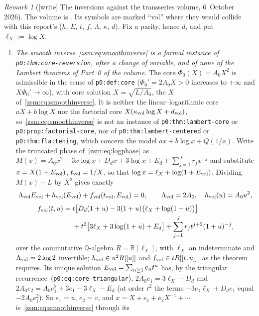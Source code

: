 \documentclass[11pt]{article}
\theoremstyle{definition}\newtheorem{definition}[theorem]{Definition}
\theoremstyle{remark}\newtheorem{remark}[theorem]{Remark}
\newcommand{\R}{\mathbb R}
\newcommand{\Q}{\mathbb Q}
\newcommand{\file}[1]{\nolinkurl{#1}}
\begin{document}
\begin{remark}[{[write]} The inversions against the transseries volume, 6~October 2026]\label{zsm:rem:transseries}
The volume is
.
Its symbols are marked ``vol'' where they would collide with this report's
($h$, $E$, $t$, $f$, $\Lambda$, $\kappa$, $d$). Fix a parity, hence $d$, and
put $\ell_X:=\log X$.
\begin{enumerate}
\item[(a)] \emph{The smooth inverse~\eqref{zsm:eq:smoothinverse} is a formal
 instance of \file{p0:thm:core-reversion}, after a change of variable, and
 of none of the Lambert theorems of Part~0 of the volume.} The core $\Phi_0(X)=A_0X^2$ is
 admissible in the sense of \file{p0:def:core} ($\Phi_0'=2A_0X>0$ increases
 to $+\infty$ and $X\Phi_0'\to\infty$), with core solution
 $X=\sqrt{L/A_0}$, the $X$ of~\eqref{zsm:eq:smoothinverse}. It is neither
 the linear--logarithmic core $aX+b\log X$ nor the factorial core
 $X(\kappa_{\rm vol}\log X+d_{\rm vol})$, so~\eqref{zsm:eq:smoothinverse} is
 not an instance of \file{p0:thm:lambert-core} or
 \file{p0:prop:factorial-core}, nor of \file{p0:thm:lambert-centered} or
 \file{p0:thm:flattening}, which concern the model $ax+b\log x+Q(1/x)$.
 Write the truncated phase of~\eqref{zsm:eq:logphase} as
 $M(x)=A_0x^2-3x\log x+D_dx+3\log x+E_d+\sum_{j=1}^Jr_jx^{-j}$ and
 substitute $x=X(1+E_{\rm vol})$, $t_{\rm vol}=1/X$, so that
 $\log x=\ell_X+\log(1+E_{\rm vol})$. Dividing $M(x)-L$ by $X^2$ gives
 exactly
 \[
  \Lambda_{\rm vol}E_{\rm vol}+h_{\rm vol}(E_{\rm vol})
  +f_{\rm vol}(t_{\rm vol},E_{\rm vol})=0,\qquad
  \Lambda_{\rm vol}=2A_0,\quad h_{\rm vol}(u)=A_0u^2,
 \]
 \begin{align*}
  f_{\rm vol}(t,u)={}&t\bigl[D_d(1+u)-3(1+u)\bigl(\ell_X+\log(1+u)\bigr)\bigr]\\
  &+t^2\bigl[3\ell_X+3\log(1+u)+E_d\bigr]
  +\sum_{j=1}^Jr_jt^{j+2}(1+u)^{-j},
 \end{align*}
 over the commutative $\Q$-algebra $R=\R[\ell_X]$, with $\ell_X$ an
 indeterminate and $\Lambda_{\rm vol}=2\log2$ invertible; $h_{\rm vol}\in
 u^2R[[u]]$ and $f_{\rm vol}\in tR[[t,u]]$, as the theorem requires. Its
 unique solution $E_{\rm vol}=\sum_{n\ge1}e_nt^n$ has, by the triangular
 recurrence~(\file{p0:eq:core-triangular}), $2A_0e_1=3\ell_X-D_d$ and
 $2A_0e_2=A_0e_1^2+3e_1-3\ell_X-E_d$ (at order $t^2$ the terms
 $-3e_1\ell_X+D_de_1$ equal $-2A_0e_1^2$). So $e_1=u$, $e_2=v$, and
 $x=X+e_1+e_2X^{-1}+\cdots$ is~\eqref{zsm:eq:smoothinverse} through its

\end{enumerate}
\end{remark}
\end{document}

